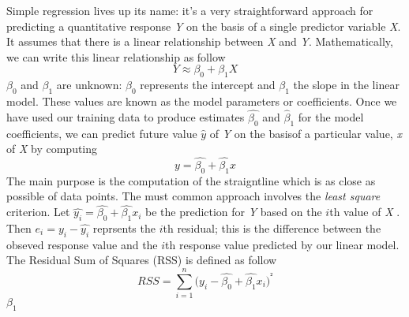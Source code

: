 \documentclass[
]{article}
\begin{document}
Simple regression lives up its name: it's a very straightforward
approach for predicting a quantitative response \emph{Y} on the basis of
a single predictor variable \emph{X}. It assumes that there is a linear
relationship between \emph{X} and \emph{Y}. Mathematically, we can write
this linear relationship as follow \[ Y\approx \beta_0+\beta_1 X\]
\(\beta_0\) and \(\beta_1\) are unknown: \(\beta_0\) represents the
intercept and \(\beta_1\) the slope in the linear model. These values
are known as the model parameters or coefficients. Once we have used our
training data to produce estimates \(\widehat{\beta_0}\) and
\(\widehat{\beta}_1\) for the model coefficients, we can predict future
value \(\widehat{y}\) of \emph{Y} on the basisof a particular value,
\emph{x} of \emph{X} by computing
\[y= \widehat{\beta_0}+\widehat{\beta_1} x\] The main purpose is the
computation of the straigntline which is as close as possible of data
points. The must common approach involves the \emph{least square}
criterion. Let \(\widehat{y_i}=\widehat{\beta_0}+\widehat{\beta_1}x_i\)
be the prediction for \emph{Y} based on the \(i\)th value of \emph{X} .
Then \(e_i=y_i-\widehat{y_i}\) reprsents the \(i\)th residual; this is
the difference between the obseved response value and the \(i\)th
response value predicted by our linear model. The Residual Sum of
Squares (RSS) is defined as follow
\[RSS=\sum_{i=1}^{n}\big(y_i- \widehat{\beta_0}+\widehat{\beta_1} x_i\big)^²\]\(\beta_1\)
\end{document}
